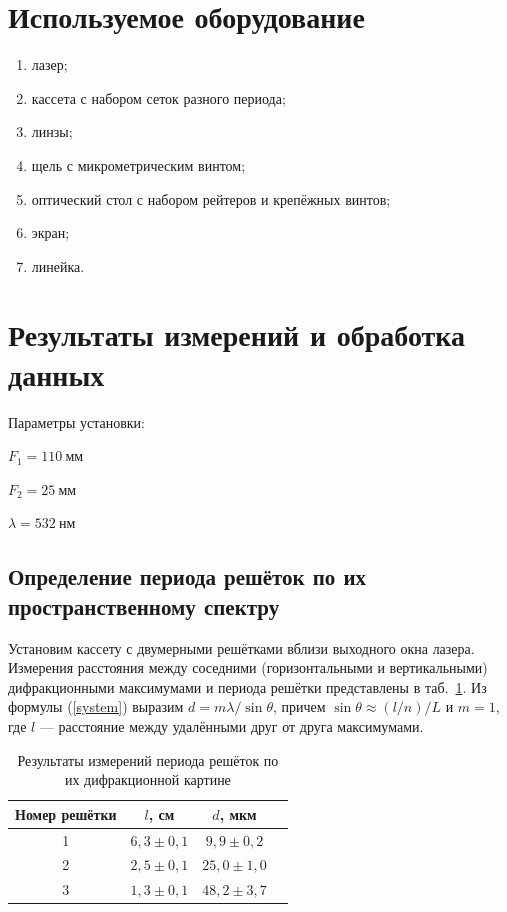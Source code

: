 \documentclass[a4paper, 12pt]{article}
\begin{document}
\section{Используемое оборудование}

\begin{enumerate}
    \item лазер;
	\item кассета с набором сеток разного периода;
	\item линзы;
	\item щель с микрометрическим винтом;
	\item оптический стол с набором рейтеров и крепёжных винтов;
	\item экран;
    \item линейка.
\end{enumerate}

\section{Результаты измерений и обработка данных}

Параметры установки:
\begin{description}
\item{} $F_1 = 110~мм$
\item{} $F_2 = 25~мм$
\item{} $\lambda = 532~нм$
\end{description}

\subsection{Определение периода решёток по их пространственному спектру}

Установим кассету с двумерными решётками вблизи выходного окна лазера. Измерения расстояния между соседними (горизонтальными и вертикальными) дифракционными максимумами и периода решётки представлены в таб.~\ref{tab1}. Из формулы (\ref{system}) выразим $d = m \lambda / \sin \theta$, причем $\sin \theta \approx (l/n)/L$ и $m = 1$, где $l$ --- расстояние между удалёнными друг от друга максимумами.

\begin{table}[h!]
\begin{center}
\begin{tabular}{|c|c|c|c|}
\hline 
Номер решётки & $l$, см & $d$, мкм  \\ 
\hline 
1 & $6,3\pm0,1$ & $9,9\pm0,2$ \\ 
\hline 
2 & $2,5\pm0,1$ & $25,0\pm1,0$ \\ 
\hline 
3 & $1,3\pm0,1$ & $48,2\pm3,7$ \\ 
\hline  
\end{tabular} 
\end{center}
\caption{Результаты измерений периода решёток по их дифракционной картине}
\label{tab1}
\end{table}
\end{document}

